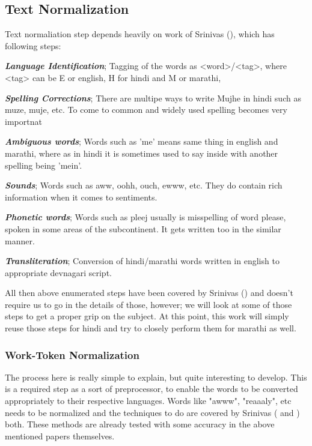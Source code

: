 \documentclass[12pt]{book}
\begin{document}
\subsection{Text Normalization}
Text normaliation step depends heavily on work of Srinivas
(\cite{sharma_text_2015}), which has following steps:
\begin{itemize*}
  \item \textbf{\textit{Language Identification}}; Tagging of the words as
      <word>/<tag>, where <tag> can be E or english, H for hindi and M or
      marathi,\\
  \item \textbf{\textit{Spelling Corrections}}; There are multipe ways to write
      Mujhe in hindi such as muze, muje, etc. To come to common and widely used
      spelling becomes very importnat\\
  \item \textbf{\textit{Ambiguous words}}; Words such as 'me' means same thing
      in english and marathi, where as in hindi it is sometimes used to say
      inside with another spelling being 'mein'. \\
  \item \textbf{\textit{Sounds}}; Words such as aww, oohh, ouch, ewww, etc.
      They do contain rich information when it comes to sentiments.\\
  \item \textbf{\textit{Phonetic words}}; Words such as pleej usually is
      misspelling of word please, spoken in some areas of the subcontinent. It
      gets written too in the similar manner.\\
  \item \textbf{\textit{Transliteration}}; Conversion of hindi/marathi words
      written in english to appropriate devnagari script.\\
\end{itemize*}

All then above enumerated steps have been covered by Srinivas
(\cite{sharma_text_2015}) and doesn't require us to go in the details of those,
however; we will look at some of those steps to get a proper grip on the
subject. At this point, this work will simply reuse those steps for hindi and try to
closely perform them for marathi as well. 

\subsubsection{Work-Token Normalization}
The process here is really simple to explain, but quite interesting to develop.
This is a required step as a sort of preprocessor, to enable the words to be
converted appropriately to their respective languages. Words like "awww",
"reaaaly", etc needs to be normalized and the techniques to do are covered by
Srinivas (\cite{sharma_text_2015} and \cite{shashank_sharma_sentiment_????}
) both. These methods are already tested with some accuracy in the above
mentioned papers themselves.  
\end{document}
